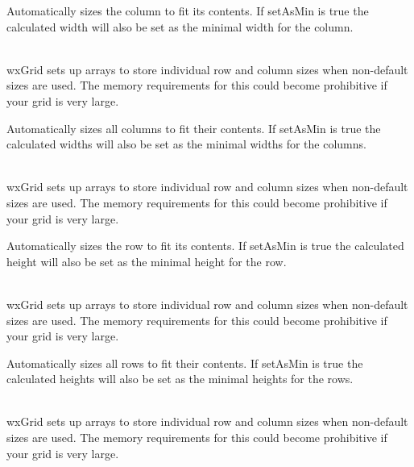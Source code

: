 \label{wxgridautosizecolumn}


Automatically sizes the column to fit its contents. If setAsMin is true the calculated width will
also be set as the minimal width for the column.

\\
wxGrid sets up arrays to store individual row and column sizes when non-default sizes are used.
The memory requirements for this could become prohibitive if your grid is very large.



\label{wxgridautosizecolumns}


Automatically sizes all columns to fit their contents. If setAsMin is true the calculated widths will
also be set as the minimal widths for the columns.

\\
wxGrid sets up arrays to store individual row and column sizes when non-default sizes are used.
The memory requirements for this could become prohibitive if your grid is very large.



\label{wxgridautosizerow}


Automatically sizes the row to fit its contents. If setAsMin is true the calculated height will
also be set as the minimal height for the row.

\\
wxGrid sets up arrays to store individual row and column sizes when non-default sizes are used.
The memory requirements for this could become prohibitive if your grid is very large.



\label{wxgridautosizerows}


Automatically sizes all rows to fit their contents. If setAsMin is true the calculated heights will
also be set as the minimal heights for the rows.

\\
wxGrid sets up arrays to store individual row and column sizes when non-default sizes are used.
The memory requirements for this could become prohibitive if your grid is very large.



